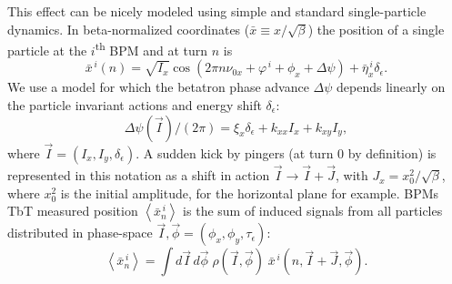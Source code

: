 \documentclass[a4paper,
               keeplastbox,   %
               ]{jacow}
\begin{document}
This effect can be nicely modeled using simple and standard single-particle dynamics\cite{laurent,lee}. In beta-normalized coordinates ($\bar{x} \equiv x / \sqrt{\beta}$) the position of a single particle at the $i$\textsuperscript{th} BPM and at turn $n$ is
\begin{equation}
\bar{x}^{\,i} (n) = \sqrt{I_x} \cos \left( 2\pi n \nu_{0x} + \varphi^{\,i} + \phi_x + \Delta \psi \right) + \bar{\eta}_x^{\,i}\delta_\epsilon.
\end{equation}
We use a model for which the betatron phase advance $\Delta\psi$ depends linearly on the particle invariant actions and energy shift $\delta_\epsilon$:
\begin{equation}
\label{tuneshift}
\Delta \psi (\vec{I}) / (2\pi) = \xi_x \delta_\epsilon + k_{xx} I_x + k_{xy} I_y,
\end{equation}
where  $\vec{I} = (I_x, I_y, \delta_\epsilon)$. A sudden kick by pingers (at turn 0 by definition) is represented in this notation as a shift in action $\vec{I} \rightarrow \vec{I} + \vec{J}$, with $J_x=x^2_0/\sqrt{\beta}$, where $x^2_0$ is the initial amplitude, for the horizontal plane for example. BPMs TbT measured position $\left< \bar{x}_n^{\,i} \right>$ is the sum of induced signals from all particles distributed in phase-space $\vec{I}, \vec{\phi}=(\phi_x,\phi_y,\tau_\epsilon)$:
\begin{equation}
\label{integration}
\left< \bar{x}_n^{\,i} \right> = \int{d\vec{I}\,d\vec{\phi} \; \rho(\vec{I}, \vec{\phi})} \; \bar{x}^{\,i} (n, \vec{I} + \vec{J}, \vec{\phi}).
\end{equation}
\end{document}
